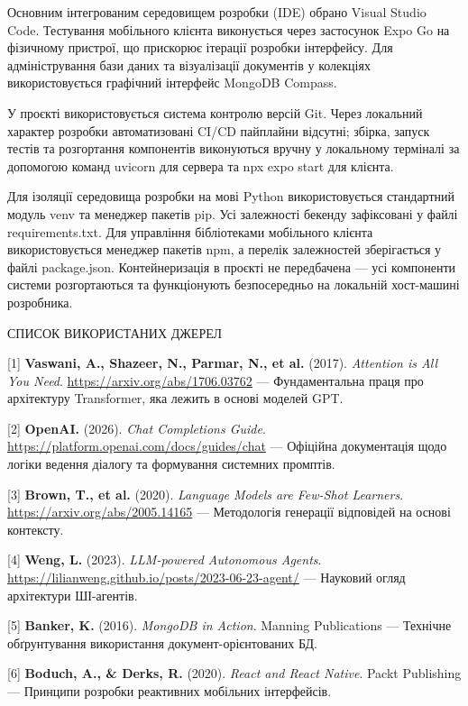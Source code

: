 Основним інтегрованим середовищем розробки (IDE) обрано Visual Studio
Code. Тестування мобільного клієнта виконується через застосунок Expo Go
на фізичному пристрої, що прискорює ітерації розробки інтерфейсу. Для
адміністрування бази даних та візуалізації документів у колекціях
використовується графічний інтерфейс MongoDB Compass.

У проєкті використовується система контролю версій Git. Через локальний
характер розробки автоматизовані CI/CD пайплайни відсутні; збірка,
запуск тестів та розгортання компонентів виконуються вручну у локальному
терміналі за допомогою команд uvicorn для сервера та npx expo start для
клієнта.

Для ізоляції середовища розробки на мові Python використовується
стандартний модуль venv та менеджер пакетів pip. Усі залежності бекенду
зафіксовані у файлі requirements.txt. Для управління бібліотеками
мобільного клієнта використовується менеджер пакетів npm, а перелік
залежностей зберігається у файлі package.json. Контейнеризація в проєкті
не передбачена --- усі компоненти системи розгортаються та функціонують
безпосередньо на локальній хост-машині розробника.

\protect{}\label{_Toc228981066}{}СПИСОК ВИКОРИСТАНИХ ДЖЕРЕЛ

{[}1{]} \textbf{Vaswani, A., Shazeer, N., Parmar, N., et al.} (2017).
\emph{Attention is All You Need}. \url{https://arxiv.org/abs/1706.03762}
--- Фундаментальна праця про архітектуру Transformer, яка лежить в
основі моделей GPT.

{[}2{]} \textbf{OpenAI.} (2026). \emph{Chat Completions Guide}.
\url{https://platform.openai.com/docs/guides/chat} --- Офіційна
документація щодо логіки ведення діалогу та формування системних
промптів.

{[}3{]} \textbf{Brown, T., et al.} (2020). \emph{Language Models are
Few-Shot Learners}. \url{https://arxiv.org/abs/2005.14165} ---
Методологія генерації відповідей на основі контексту.

{[}4{]} \textbf{Weng, L.} (2023). \emph{LLM-powered Autonomous Agents}.
\url{https://lilianweng.github.io/posts/2023-06-23-agent/} --- Науковий
огляд архітектури ШІ-агентів.

{[}5{]} \textbf{Banker, K.} (2016). \emph{MongoDB in Action}. Manning
Publications --- Технічне обґрунтування використання
документ-орієнтованих БД.

{[}6{]} \textbf{Boduch, A., \& Derks, R.} (2020). \emph{React and React
Native}. Packt Publishing --- Принципи розробки реактивних мобільних
інтерфейсів.

